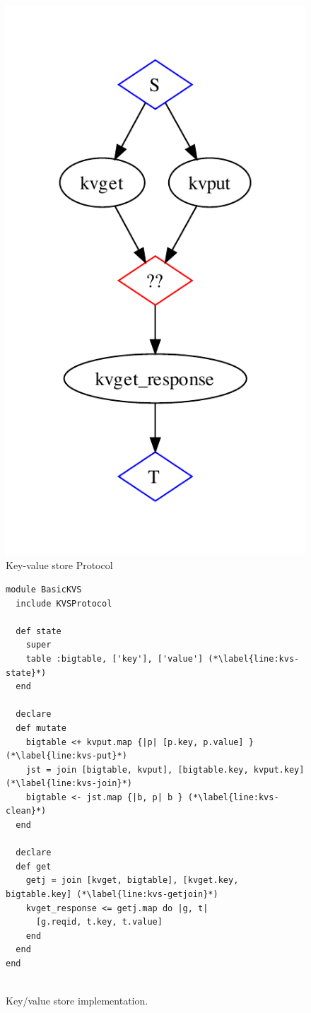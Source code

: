 \begin{figure}[t]
\centering
\includegraphics[width=0.4\linewidth]{fig/kvs_proto_pdg.pdf}
\vspace{-10pt}
\caption{Key-value store Protocol}
\label{fig:kvs-proto-pdg}
\vspace{-2pt}
\end{figure}


\begin{figure}[t]
\begin{scriptsize}
\begin{lstlisting}
module BasicKVS
  include KVSProtocol

  def state
    super
    table :bigtable, ['key'], ['value'] (*\label{line:kvs-state}*)
  end

  declare
  def mutate
    bigtable <+ kvput.map {|p| [p.key, p.value] } (*\label{line:kvs-put}*)
    jst = join [bigtable, kvput], [bigtable.key, kvput.key] (*\label{line:kvs-join}*)
    bigtable <- jst.map {|b, p| b } (*\label{line:kvs-clean}*)
  end

  declare
  def get
    getj = join [kvget, bigtable], [kvget.key, bigtable.key] (*\label{line:kvs-getjoin}*)
    kvget_response <= getj.map do |g, t|
      [g.reqid, t.key, t.value]
    end
  end
end


\end{lstlisting}
\vspace{-10pt}
\caption{Key/value store implementation.}
\label{fig:kvs-impl}
\end{scriptsize}
\vspace{-2pt}
\end{figure}



